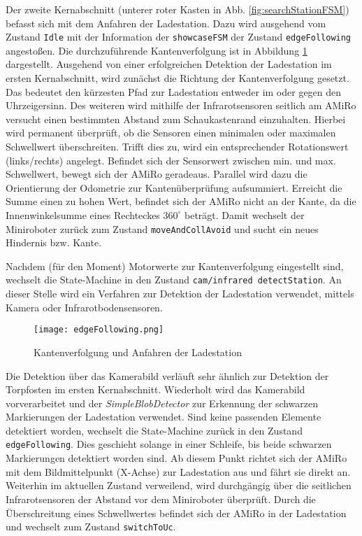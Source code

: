 Der zweite Kernabschnitt (unterer roter Kasten in Abb. \ref{fig:searchStationFSM}) befasst sich mit dem Anfahren der Ladestation. Dazu wird ausgehend vom Zustand \texttt{Idle} mit der Information der \texttt{showcaseFSM} der Zustand \texttt{edgeFollowing} angestoßen. Die durchzuführende Kantenverfolgung ist in Abbildung \ref{fig:edgeFollowing} dargestellt. Ausgehend von einer erfolgreichen Detektion der Ladestation im ersten Kernabschnitt, wird zunächst die Richtung der Kantenverfolgung gesetzt. Das bedeutet den kürzesten Pfad zur Ladestation entweder im oder gegen den Uhrzeigersinn. Des weiteren wird mithilfe der Infrarotsensoren seitlich am AMiRo versucht einen bestimmten Abstand zum Schaukastenrand einzuhalten. Hierbei wird permanent überprüft, ob die Sensoren einen minimalen oder maximalen Schwellwert überschreiten. Trifft dies zu, wird ein entsprechender Rotationswert (links/rechts) angelegt. Befindet sich der Sensorwert zwischen min. und max. Schwellwert, bewegt sich der AMiRo geradeaus. Parallel wird dazu die Orientierung der Odometrie zur Kantenüberprüfung aufsummiert. Erreicht die Summe einen zu hohen Wert, befindet sich der AMiRo nicht an der Kante, da die Innenwinkelsumme eines Rechteckes $360^\circ$ beträgt. Damit wechselt der Miniroboter zurück zum Zustand \texttt{moveAndCollAvoid} und sucht ein neues Hindernis bzw. Kante.

Nachdem (für den Moment) Motorwerte zur Kantenverfolgung eingestellt sind, wechselt die State-Machine in den Zustand \texttt{cam/infrared detectStation}. An dieser Stelle wird ein Verfahren zur Detektion der Ladestation verwendet, mittels Kamera oder Infrarotbodensensoren.

\begin{figure}[H]
	\begin{center}
		\texttt{[image: edgeFollowing.png]} 	
		\caption{Kantenverfolgung und Anfahren der Ladestation}
		\label{fig:edgeFollowing}
	\end{center}
\end{figure}

Die Detektion über das Kamerabild verläuft sehr ähnlich zur Detektion der Torpfosten im ersten Kernabschnitt. Wiederholt wird das Kamerabild vorverarbeitet und der \textit{SimpleBlobDetector} zur Erkennung der schwarzen Markierungen der Ladestation verwendet. Sind keine passenden Elemente detektiert worden, wechselt die State-Machine zurück in den Zustand \texttt{edgeFollowing}. Dies geschieht solange in einer Schleife, bis beide schwarzen Markierungen detektiert worden sind. Ab diesem Punkt richtet sich der AMiRo mit dem Bildmittelpunkt (X-Achse) zur Ladestation aus und fährt sie direkt an. Weiterhin im aktuellen Zustand verweilend, wird durchgängig über die seitlichen Infrarotsensoren der Abstand vor dem Miniroboter überprüft. Durch die Überschreitung eines Schwellwertes befindet sich der AMiRo in der Ladestation und wechselt zum Zustand \texttt{switchToUc}.

